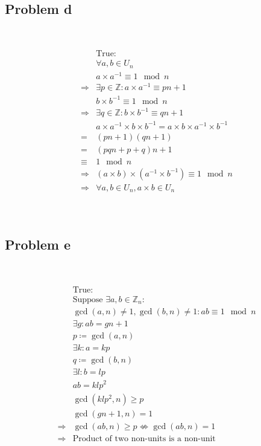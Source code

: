 \documentclass{article}
\begin{document}
~

\subsection*{Problem d}

~

\begin{align*}
    &\text{True}:\\
    &\forall a,b\in U_n\\
    &a\times a^{-1}\equiv 1\mod n\\
    \Rightarrow&\exists p\in\mathbb{Z} :a\times a^{-1}\equiv pn+1\\
    &b\times b^{-1}\equiv 1\mod n\\
    \Rightarrow&\exists q\in\mathbb{Z} :b\times b^{-1}\equiv qn+1\\
    &a\times a^{-1}\times b\times b^{-1}=a\times b\times a^{-1}\times b^{-1}\\
    =&(pn+1)(qn+1)\\
    =&(pqn+p+q)n+1\\
    \equiv&1\mod n\\
    \Rightarrow&(a\times b)\times(a^{-1}\times b^{-1})\equiv 1\mod n\\
    \Rightarrow&\forall a,b\in U_n,a\times b\in U_n\\
\end{align*}

~

\subsection*{Problem e}

~

\begin{align*}
    &\text{True}:\\
    &\text{Suppose }\exists a,b\in \mathbb{Z} _n:\\
    &\gcd(a,n)\ne1,\gcd(b,n)\ne 1:ab\equiv 1\mod n\\
    &\exists g:ab=gn+1\\
    &p\coloneqq\gcd(a,n)\\
    &\exists k:a=kp\\
    &q\coloneqq\gcd(b,n)\\
    &\exists l:b=lp\\
    &ab=klp^2\\
    &\gcd(klp^2,n)\geqslant p\\
    &\gcd(gn+1,n)=1\\
    \Rightarrow&\gcd(ab,n)\geqslant p\nLeftrightarrow \gcd(ab,n)=1\\
    \Rightarrow&\text{Product of two non-units is a non-unit}\\
\end{align*}
\end{document}
